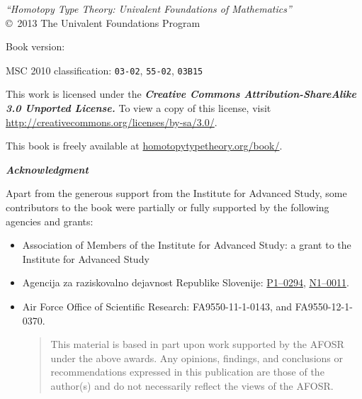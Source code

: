 \hbox{}
\vfill

{\small
\noindent
\emph{``Homotopy Type Theory: Univalent Foundations of Mathematics''}\\
\copyright\ 2013 The Univalent Foundations Program

\medskip
\noindent
Book version: \texttt{\OPTversion}

\medskip
\noindent
MSC 2010 classification:
\texttt{03-02},
\texttt{55-02},
\texttt{03B15}

\bigskip
\footnotesize

\noindent
This work is licensed under the
\textbf{\emph{Creative Commons Attribution-ShareAlike 3.0 Unported License.}}
%
To view a copy of this license, visit
\href{http://creativecommons.org/licenses/by-sa/3.0/}{http://creativecommons.org/licenses/by-sa/3.0/}.

\bigskip

\noindent
This book is freely available at \href{http://homotopytypetheory.org/book/}{homotopytypetheory.org/book/}.

\bigskip

\noindent
\emph{\textbf{\small Acknowledgment}}

\medskip

\noindent
Apart from the generous support from the Institute for Advanced Study, some contributors
to the book were partially or fully supported by the following agencies and grants:
%
\begin{itemize}
\item Association of Members of the Institute for Advanced Study: a grant to the Institute for Advanced Study %
\item Agencija za raziskovalno dejavnost Republike Slovenije:  %
\href{http://www.sicris.si/search/prg.aspx?id=6120}{P1--0294},
\href{http://www.sicris.si/search/prj.aspx?id=7109}{N1--0011}.

\item Air Force Office of Scientific Research:
  FA9550-11-1-0143, and %
  FA9550-12-1-0370.  %
  {
    \setlength{\parskip}{0pt}
    \begin{quote}
      \noindent\scriptsize
      This material is based in part upon work supported by the AFOSR under the above awards.
      Any opinions, findings, and conclusions or recommendations expressed in this publication are those of the author(s) and do not necessarily reflect the views of the AFOSR.
    \end{quote}
  }


\end{itemize}}
